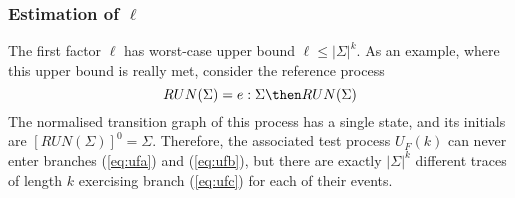 \subsubsection*{Estimation of $\ell$}
The first factor $\ell$
has worst-case upper bound $\ell\le |\Sigma|^k$. As an example, where this upper bound 
is really met, consider the reference process
\[
RUN(\Sigma) = e:\Sigma \then RUN(\Sigma)
\]
The normalised transition graph of this process has a single state, and its initials
are $[RUN(\Sigma)]^0 = \Sigma$. Therefore, the associated test process $U_F(k)$ can 
never enter branches (\ref{eq:ufa}) and (\ref{eq:ufb}), but there are exactly 
$|\Sigma|^k$ different traces of length $k$ exercising branch (\ref{eq:ufc})
for each of their events.

